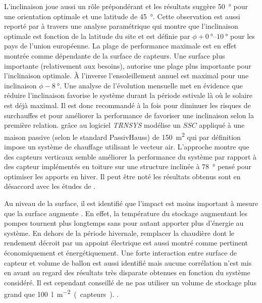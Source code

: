 L’inclinaison joue aussi un rôle prépondérant et les résultats suggère \SI{50}{\degree}
pour une orientation optimale et une latitude de \SI{45}{\degree}. Cette observation est
aussi reporté par \textcite{Shariah2002587} à travers une analyse paramétrique qui montre
que l’inclinaison optimale est fonction de la latitude du site et est définie par $\phi +
\SIrange{0}{10}{\degree}$ pour les pays de l’union européenne. La plage de performance
maximale est en effet montrée comme dépendante de la surface de capteurs.
Une surface plus importante (relativement aux besoins), autorise une plage plus importante
pour l’inclinaison optimale. À l’inverse l’ensoleillement annuel est maximal pour
une inclinaison $\phi - \SI{8}{\degree}$. Une analyse de l’évolution mensuelle met
en évidence que réduire l’inclinaison favorise le système durant la période estivale
là où le solaire est déjà maximal. Il est donc recommandé à la fois pour diminuer
les risques de surchauffes et pour améliorer la performance de favoriser une
inclinaison selon la première relation.
\textcite{Badescu2006129} grâce au logiciel \textit{TRNSYS} modélise un $SSC$
appliqué à une maison passive (selon le standard PassivHauss) de \SI{150}{\metre\squared}
qui par définition impose un système de chauffage utilisant le vecteur air. L’approche montre que des
capteurs verticaux semble améliorer la performance du système par rapport à des
capteur implémentés en toiture sur une structure inclinée à \SI{78}{\degree} pensé pour optimiser les apports
en hiver. Il peut être noté les résultats obtenus sont en désaccord avec les études
de \textcite{Task26C2007,Shariah2002587}.




Au niveau de la surface, il est identifié que l’impact est moins important à mesure
que la surface augmente \parencite{Task26C2007}. En effet, la température du stockage augmentant les pompes
tournent plus longtemps sans pour autant apporter plus d’énergie au système. En dehors
de la période hivernale, remplacer la chaudière dont le rendement décroit par un appoint
électrique est aussi montré comme pertinent économiquement et énergétiquement.
Une forte interaction entre surface de capteur et volume de ballon est aussi identifié
mais aucune corrélation n’est mis en avant au regard des résultats très disparate
obtenues en fonction du système considéré. Il est cependant conseillé de ne pas utiliser
un volume de stockage plus grand que \SI{100}{\litre\per\metre\squared (capteurs)}.
.

